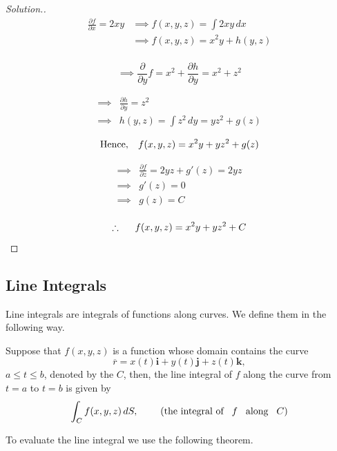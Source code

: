 \documentclass[11pt,a4paper]{article}
\theoremstyle{definition}
\newenvironment{solution}
  {\renewcommand{\qedsymbol}{}\begin{proof}[\textit{Solution}.]}
  {\end{proof}}
\begin{document}
\begin{solution}
\begin{align*}
\frac{\partial f}{\partial x} = 2xy & \implies f(x,y,z) = \int 2xy\,dx\\
& \implies f(x,y,z) = x^2y + h(y,z)\\
\end{align*}

$$\implies \frac{\partial}{\partial y}f = x^2 + \frac{\partial h}{\partial y} = x^2 + z^2$$

\begin{align*}
\implies & \frac{\partial h}{\partial y} = z^2\\
\implies & h(y,z) = \int z^2\,dy = yz^2 + g(z)
\end{align*}

$$\text{Hence},\hspace{0.3cm} f(x,y,z) = x^2y + yz^2 + g(z)$$

\begin{align*}
\implies & \frac{\partial f}{\partial z} = 2yz + g'(z) = 2yz\\
\implies & g'(z) = 0\\
\implies & g(z) = C\\
\end{align*}

$$\therefore \hspace{0.5cm} f(x,y,z) = x^2y + yz^2 + C$$
\end{solution}


{\color[wave]{485}\subsection{Line Integrals}}
Line integrals are integrals of functions along curves. We define them in the following way.


Suppose that $f(x,y,z)$ is a function whose domain contains the curve $$\overline{r} = x(t)\textbf{i} + y(t) \textbf{j} + z(t)\textbf{k},$$ $a\leq t\leq b$, denoted by the $C$, then, the line integral of $f$ along the curve from $t =a$ to $t=b$ is given by $$\int_C f(x,y,z)\,dS,\hspace{0.8cm}(\text{the integral of}\hspace{0.3cm} f\hspace{0.3cm} \text{along}\hspace{0.3cm} C)$$

To evaluate the line integral we use the following theorem.
\end{document}
